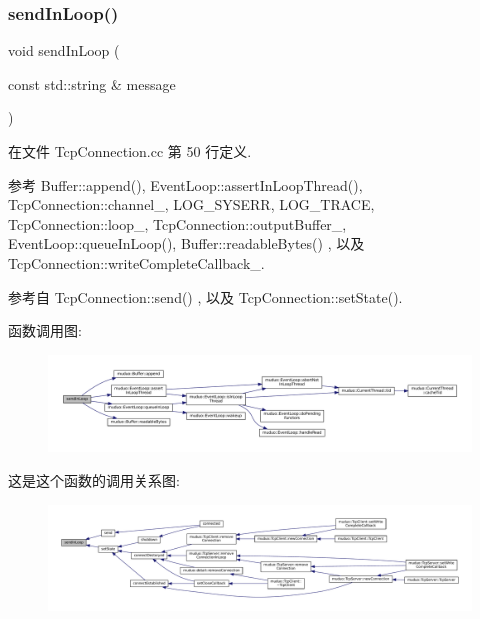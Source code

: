 \subsubsection{\texorpdfstring{send\+In\+Loop()}{sendInLoop()}}
{\footnotesize\ttfamily void send\+In\+Loop (\begin{DoxyParamCaption}\item[{const std\+::string \&}]{message }\end{DoxyParamCaption})\hspace{0.3cm}{\ttfamily [private]}}



在文件 Tcp\+Connection.\+cc 第 50 行定义.



参考 Buffer\+::append(), Event\+Loop\+::assert\+In\+Loop\+Thread(), Tcp\+Connection\+::channel\+\_\+, L\+O\+G\+\_\+\+S\+Y\+S\+E\+RR, L\+O\+G\+\_\+\+T\+R\+A\+CE, Tcp\+Connection\+::loop\+\_\+, Tcp\+Connection\+::output\+Buffer\+\_\+, Event\+Loop\+::queue\+In\+Loop(), Buffer\+::readable\+Bytes() , 以及 Tcp\+Connection\+::write\+Complete\+Callback\+\_\+.



参考自 Tcp\+Connection\+::send() , 以及 Tcp\+Connection\+::set\+State().

函数调用图\+:
\nopagebreak
\begin{figure}[H]
\begin{center}
\leavevmode
\includegraphics[width=350pt]{classmuduo_1_1TcpConnection_a016986a5f7c6f0d415e25b4b6bdbf481_cgraph}
\end{center}
\end{figure}
这是这个函数的调用关系图\+:
\nopagebreak
\begin{figure}[H]
\begin{center}
\leavevmode
\includegraphics[width=350pt]{classmuduo_1_1TcpConnection_a016986a5f7c6f0d415e25b4b6bdbf481_icgraph}
\end{center}
\end{figure}
\mbox{\label{classmuduo_1_1TcpConnection_acb32ba0eda160676b4fc98d756ee3515}} 
